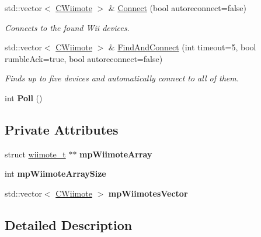 \begin{DoxyCompactItemize}
\item 
std\-::vector$<$ \hyperlink{class_c_wiimote}{\-C\-Wiimote} $>$ \& \hyperlink{class_c_wii_aae588e4b73fc2cfe2a50dcc6d23e695d}{\-Connect} (bool autoreconnect=false)
\begin{DoxyCompactList}\small\item\em \-Connects to the found \-Wii devices. \end{DoxyCompactList}\item 
std\-::vector$<$ \hyperlink{class_c_wiimote}{\-C\-Wiimote} $>$ \& \hyperlink{class_c_wii_ab6ea1b11c12f707d410bf36fee0b16ed}{\-Find\-And\-Connect} (int timeout=5, bool rumble\-Ack=true, bool autoreconnect=false)
\begin{DoxyCompactList}\small\item\em \-Finds up to five devices and automatically connect to all of them. \end{DoxyCompactList}\item 
\hypertarget{class_c_wii_acc7affc0e84327f24bd20ef10930f66e}{int {\bfseries \-Poll} ()}\label{class_c_wii_acc7affc0e84327f24bd20ef10930f66e}

\end{DoxyCompactItemize}
\subsection*{\-Private \-Attributes}
\begin{DoxyCompactItemize}
\item 
\hypertarget{class_c_wii_a3067cf1e3f592f3a54afc8cd4d9f04a8}{struct \hyperlink{structwiimote__t}{wiimote\-\_\-t} $\ast$$\ast$ {\bfseries mp\-Wiimote\-Array}}\label{class_c_wii_a3067cf1e3f592f3a54afc8cd4d9f04a8}

\item 
\hypertarget{class_c_wii_ac1979ba03a5d6d4cb90392184bdb083d}{int {\bfseries mp\-Wiimote\-Array\-Size}}\label{class_c_wii_ac1979ba03a5d6d4cb90392184bdb083d}

\item 
\hypertarget{class_c_wii_a85afbf07952e71e4ee87b9a5b6df73e6}{std\-::vector$<$ \hyperlink{class_c_wiimote}{\-C\-Wiimote} $>$ {\bfseries mp\-Wiimotes\-Vector}}\label{class_c_wii_a85afbf07952e71e4ee87b9a5b6df73e6}

\end{DoxyCompactItemize}


\subsection{\-Detailed \-Description}


